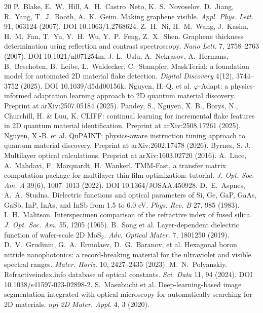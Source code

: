 \documentclass[10pt]{article}
\begin{document}
\begin{thebibliography}{20}
 P.~Blake, E.~W.~Hill, A.~H.~Castro~Neto, K.~S.~Novoselov, D.~Jiang, R.~Yang, T.~J.~Booth, A.~K.~Geim. Making graphene visible. \emph{Appl. Phys. Lett.} 91, 063124 (2007). DOI 10.1063/1.2768624.
 Z.~H.~Ni, H.~M.~Wang, J.~Kasim, H.~M.~Fan, T.~Yu, Y.~H.~Wu, Y.~P.~Feng, Z.~X.~Shen. Graphene thickness determination using reflection and contrast spectroscopy. \emph{Nano Lett.} 7, 2758--2763 (2007). DOI 10.1021/nl071254m.
 J.-L.~Uslu, A.~Nekrasov, A.~Hermans, B.~Beschoten, B.~Leibe, L.~Waldecker, C.~Stampfer. MaskTerial: a foundation model for automated 2D material flake detection. \emph{Digital Discovery} 4(12), 3744--3752 (2025). DOI 10.1039/d5dd00156k.
 Nguyen, H.-Q. et al. $\varphi$-Adapt: a physics-informed adaptation learning approach to 2D quantum material discovery. Preprint at arXiv:2507.05184 (2025).
 Pandey, S., Nguyen, X. B., Borys, N., Churchill, H. \& Luu, K. CLIFF: continual learning for incremental flake features in 2D quantum material identification. Preprint at arXiv:2508.17261 (2025).
 Nguyen, X.-B. et al. QuPAINT: physics-aware instruction tuning approach to quantum material discovery. Preprint at arXiv:2602.17478 (2026).
 Byrnes, S. J. Multilayer optical calculations. Preprint at arXiv:1603.02720 (2016).
 A.~Luce, A.~Mahdavi, F.~Marquardt, H.~Wankerl. TMM-Fast, a transfer matrix computation package for multilayer thin-film optimization: tutorial. \emph{J. Opt. Soc. Am. A} 39(6), 1007--1013 (2022). DOI 10.1364/JOSAA.450928.
 D.~E.~Aspnes, A.~A.~Studna. Dielectric functions and optical parameters of Si, Ge, GaP, GaAs, GaSb, InP, InAs, and InSb from 1.5 to 6.0 eV. \emph{Phys. Rev. B} 27, 985 (1983).
 I.~H.~Malitson. Interspecimen comparison of the refractive index of fused silica. \emph{J. Opt. Soc. Am.} 55, 1205 (1965).
 B.~Song et al. Layer-dependent dielectric function of wafer-scale 2D MoS$_2$. \emph{Adv. Optical Mater.} 7, 1801250 (2019).
 D.~V.~Grudinin, G.~A.~Ermolaev, D.~G.~Baranov, et al. Hexagonal boron nitride nanophotonics: a record-breaking material for the ultraviolet and visible spectral ranges. \emph{Mater. Horiz.} 10, 2427--2435 (2023).
 M.~N.~Polyanskiy. Refractiveindex.info database of optical constants. \emph{Sci. Data} 11, 94 (2024). DOI 10.1038/s41597-023-02898-2.
 S.~Masubuchi et al. Deep-learning-based image segmentation integrated with optical microscopy for automatically searching for 2D materials. \emph{npj 2D Mater. Appl.} 4, 3 (2020).

\end{thebibliography}
\end{document}
